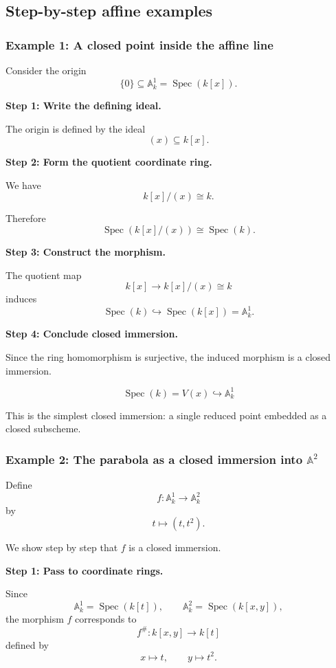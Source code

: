 \documentclass[12pt,a4paper]{article}
\theoremstyle{notespace}
\begin{document}
\subsection{Step-by-step affine examples}

\subsubsection{Example 1: A closed point inside the affine line}

Consider the origin
\[
\{0\}\subseteq \mathbb{A}^{1}_{k}
=
\operatorname{Spec}(k[x]).
\]

\textbf{Step 1: Write the defining ideal.}

The origin is defined by the ideal
\[
(x)\subseteq k[x].
\]

\textbf{Step 2: Form the quotient coordinate ring.}

We have
\[
k[x]/(x)\cong k.
\]

Therefore
\[
\operatorname{Spec}(k[x]/(x))
\cong
\operatorname{Spec}(k).
\]

\textbf{Step 3: Construct the morphism.}

The quotient map
\[
k[x]\longrightarrow k[x]/(x)\cong k
\]
induces
\[
\operatorname{Spec}(k)
\hookrightarrow
\operatorname{Spec}(k[x])
=
\mathbb{A}^{1}_{k}.
\]

\textbf{Step 4: Conclude closed immersion.}

Since the ring homomorphism is surjective, the induced morphism is a closed immersion.

\[
\boxed{
	\operatorname{Spec}(k)
	=
	V(x)
	\hookrightarrow
	\mathbb{A}^{1}_{k}
}
\]

This is the simplest closed immersion: a single reduced point embedded as a closed subscheme.

\subsubsection{Example 2: The parabola as a closed immersion into \(\mathbb{A}^{2}\)}

Define
\[
f:\mathbb{A}^{1}_{k}\longrightarrow \mathbb{A}^{2}_{k}
\]
by
\[
t\longmapsto (t,t^{2}).
\]

We show step by step that \(f\) is a closed immersion.

\textbf{Step 1: Pass to coordinate rings.}

Since
\[
\mathbb{A}^{1}_{k}=\operatorname{Spec}(k[t]),
\qquad
\mathbb{A}^{2}_{k}=\operatorname{Spec}(k[x,y]),
\]
the morphism \(f\) corresponds to
\[
f^{\#}:k[x,y]\longrightarrow k[t]
\]
defined by
\[
x\longmapsto t,
\qquad
y\longmapsto t^{2}.
\]
\end{document}
